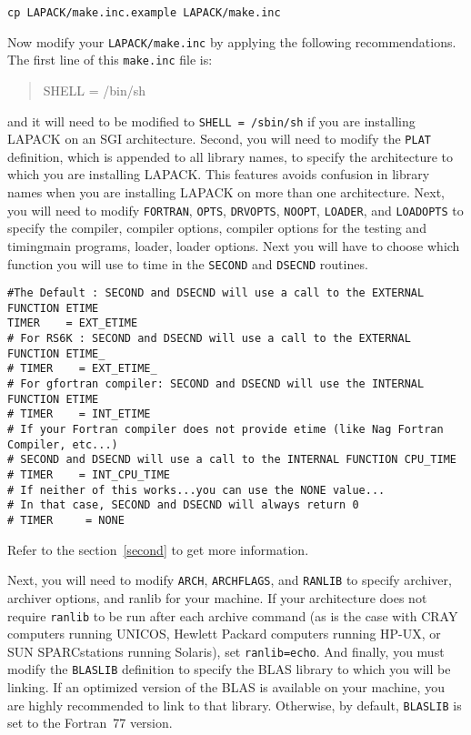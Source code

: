 \documentclass[11pt]{report}
\begin{document}
\begin{list}{}
\item{\texttt{cp LAPACK/make.inc.example LAPACK/make.inc}}
\end{list}

\noindent
Now modify your \texttt{LAPACK/make.inc} by applying the following recommendations.
The first line of this \texttt{make.inc} file is:
\begin{quote}
SHELL = /bin/sh
\end{quote}
and it will need to be modified to \texttt{SHELL = /sbin/sh} if you are
installing LAPACK on an SGI architecture.
Second, you will
need to modify the \texttt{PLAT} definition, which is appended to all
library names, to specify the architecture to which you are installing
LAPACK.  This features avoids confusion in library names when you are
installing LAPACK on more than one architecture.  Next, you will need
to modify \texttt{FORTRAN}, \texttt{OPTS}, \texttt{DRVOPTS}, \texttt{NOOPT}, \texttt{LOADER},
and \texttt{LOADOPTS} to specify
the compiler, compiler options, compiler options for the testing and
timing\footnotemark[\value{footnote}] main programs, loader, loader options.
Next you will have to choose which function you will use to time in the \texttt{SECOND} and \texttt{DSECND} routines.
\begin{verbatim}
#The Default : SECOND and DSECND will use a call to the EXTERNAL FUNCTION ETIME
TIMER    = EXT_ETIME
# For RS6K : SECOND and DSECND will use a call to the EXTERNAL FUNCTION ETIME_ 
# TIMER    = EXT_ETIME_
# For gfortran compiler: SECOND and DSECND will use the INTERNAL FUNCTION ETIME
# TIMER    = INT_ETIME
# If your Fortran compiler does not provide etime (like Nag Fortran Compiler, etc...)
# SECOND and DSECND will use a call to the INTERNAL FUNCTION CPU_TIME
# TIMER    = INT_CPU_TIME
# If neither of this works...you can use the NONE value... 
# In that case, SECOND and DSECND will always return 0
# TIMER     = NONE
\end{verbatim}
Refer to the section~\ref{second} to get more information.


Next, you will need to modify \texttt{ARCH}, \texttt{ARCHFLAGS}, and \texttt{RANLIB} to specify archiver,
archiver options, and ranlib for your machine.  If your architecture
does not require \texttt{ranlib} to be run after each archive command (as
is the case with CRAY computers running UNICOS, Hewlett Packard
computers running HP-UX, or SUN SPARCstations running Solaris), set
\texttt{ranlib=echo}.  And finally, you must
modify the \texttt{BLASLIB} definition to specify the BLAS library to which
you will be linking.  If an optimized version of the BLAS is available
on your machine, you are highly recommended to link to that library.
Otherwise, by default, \texttt{BLASLIB} is set to the Fortran~77 version.
\end{document}
